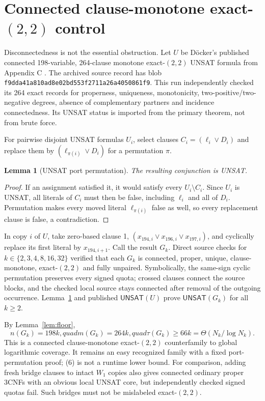 \documentclass[11pt]{article}
\newtheorem{lemma}[theorem]{Lemma}
\newcommand{\UNSAT}{\mathsf{UNSAT}}
\begin{document}
\section{Connected clause-monotone exact-$(2,2)$ control}
Disconnectedness is not the essential obstruction.  Let $U$ be D\"ocker's
published connected 198-variable, 264-clause monotone exact-$(2,2)$ UNSAT
formula from Appendix C \cite{docker}.  The archived source record has blob
\texttt{f9dda41a810ad8e02bd553f2711a26a4050861f9}.  This run independently
checked its 264 exact records for properness, uniqueness, monotonicity,
two-positive/two-negative degrees, absence of complementary partners and
incidence connectedness.  Its UNSAT status is imported from the primary
theorem, not from brute force.

For pairwise disjoint UNSAT formulas $U_i$, select clauses
$C_i=(\ell_i\vee D_i)$ and replace them by
$(\ell_{\pi(i)}\vee D_i)$ for a permutation $\pi$.
\begin{lemma}[UNSAT port permutation]\label{lem:port}
The resulting conjunction is UNSAT.
\end{lemma}
\begin{proof}
If an assignment satisfied it, it would satisfy every $U_i\setminus C_i$.
Since $U_i$ is UNSAT, all literals of $C_i$ must then be false, including
$\ell_i$ and all of $D_i$.  Permutation makes every moved literal
$\ell_{\pi(i)}$ false as well, so every replacement clause is false, a
contradiction.
\end{proof}

In copy $i$ of $U$, take zero-based clause 1,
$(x_{194,i}\vee x_{196,i}\vee x_{197,i})$, and cyclically replace its first
literal by $x_{194,i+1}$.  Call the result $G_k$.  Direct source checks for
$k\in\{2,3,4,8,16,32\}$ verified that each $G_k$ is connected, proper,
unique, clause-monotone, exact-$(2,2)$ and fully unpaired.  Symbolically,
the same-sign cyclic permutation preserves every signed quota; crossed
clauses connect the source blocks, and the checked local source stays
connected after removal of the outgoing occurrence.  Lemma~\ref{lem:port}
and published $\UNSAT(U)$ prove $\UNSAT(G_k)$ for all $k\ge2$.

By Lemma~\ref{lem:floor},
\[
n(G_k)=198k,quad m(G_k)=264k,quad
\tau(G_k)\ge66k=\Theta(N_k/\log N_k).                   \tag{6}
\]
This is a connected clause-monotone exact-$(2,2)$ counterfamily to global
logarithmic coverage.  It remains an easy recognized family with a fixed
port-permutation proof; (6) is not a runtime lower bound.  For comparison,
adding fresh bridge clauses to intact $W_1$ copies also gives connected
ordinary proper 3CNFs with an obvious local UNSAT core, but independently
checked signed quotas fail.  Such bridges must not be mislabeled exact-$(2,2)$.
\end{document}
